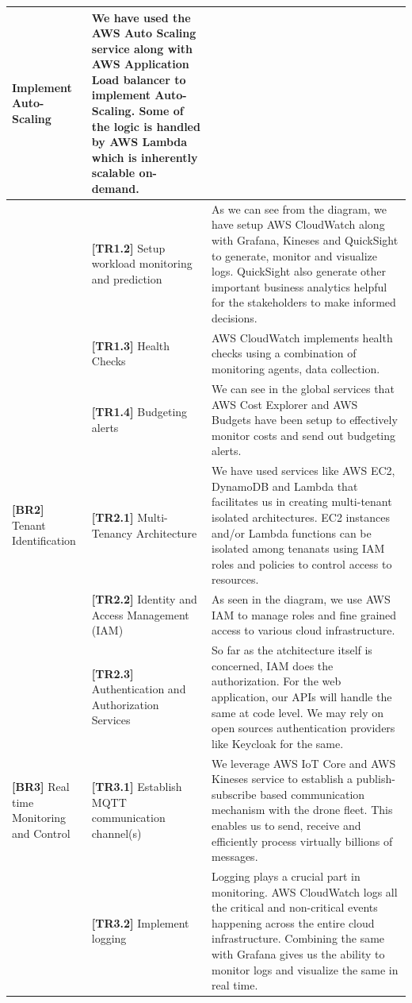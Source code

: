 \documentclass{article}
\begin{document}
\begin{table}[H]
\begin{tabular}{|p{0.2\linewidth}| p{0.3\linewidth} | p{0.5\linewidth} |}
         Implement Auto-Scaling &  We have used the AWS Auto Scaling service along with AWS Application Load balancer to implement Auto-Scaling. Some of the logic is handled by AWS Lambda which is inherently scalable on-demand.  \\ \hline 
         &  \textbf{[TR1.2]} Setup workload monitoring and  
         prediction &  As we can see from the diagram, we have setup AWS CloudWatch along with Grafana, Kineses and  QuickSight to generate, monitor and visualize logs. QuickSight also generate other important business analytics helpful for the stakeholders to make informed decisions. \\ \hline 
         &  \textbf{[TR1.3]} Health Checks & AWS CloudWatch implements health checks using a combination of monitoring agents, data collection. \\ \hline 
         &  \textbf{[TR1.4]} Budgeting alerts & We can see in the global services that AWS Cost Explorer and AWS Budgets have been setup to effectively monitor costs and send out budgeting alerts. \\ \hline 
         \textbf{[BR2]} Tenant Identification &  \textbf{[TR2.1]} Multi-Tenancy Architecture &  We have used services like AWS EC2, DynamoDB and Lambda that facilitates us in creating multi-tenant isolated architectures. EC2 instances and/or Lambda functions can be isolated among tenanats using IAM roles and policies to control access to resources.\\ \hline 
         &  \textbf{[TR2.2]} Identity and Access Management (IAM) &  As seen in the diagram, we use AWS IAM to manage roles and fine grained access to various cloud infrastructure.  \\  \hline 
         &  \textbf{[TR2.3]} Authentication and Authorization Services &  So far as the atchitecture itself is concerned, IAM does the authorization. For the web application, our APIs will handle the same at code level. We may rely on open sources authentication providers like Keycloak for the same. \\ \hline 
         \textbf{[BR3]} Real time Monitoring and Control &   \textbf{[TR3.1]} Establish MQTT communication channel(s) & We leverage AWS IoT Core and AWS Kineses service to establish a publish-subscribe based communication mechanism with the drone fleet. This enables us to send, receive and efficiently process virtually billions of messages.  \\ \hline 
         &  \textbf{[TR3.2]} Implement logging &  Logging plays a crucial part in monitoring. AWS CloudWatch logs all the critical and non-critical events happening across the entire cloud infrastructure. Combining the same with Grafana gives us the ability to monitor logs and visualize the same in real time. \\ \hline 
    \end{tabular}
\end{table}
\end{document}

